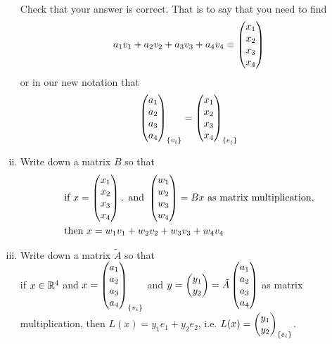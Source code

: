 \begin{question}
\begin{enumerate}[(i)]
\[\begin{aligned}
            \end{aligned}
        \]
        Check that your answer is correct. That is to say that you need to find 
        \[
            \begin{aligned}
                a_1v_1+a_2v_2+a_3v_3+a_4v_4=\begin{pmatrix} x_1\\ x_2\\x_3 \\ x_4\end{pmatrix}
            \end{aligned}
        \]
        or in our new notation that 
        \[
            \begin{aligned}
                \begin{pmatrix} a_1\\ a_2\\a_3 \\ a_4\end{pmatrix}_{\{v_i\}}=\begin{pmatrix} x_1\\ x_2\\x_3 \\ x_4\end{pmatrix}_{\{e_i\}}
            \end{aligned}
        \]
        \item Write down a matrix $B$ so that 
        \[
            \begin{aligned}
                &\text{if } x=\begin{pmatrix} x_1\\ x_2\\x_3 \\ x_4\end{pmatrix},\text{ and } \begin{pmatrix} w_1\\ w_2\\w_3 \\ w_4\end{pmatrix}=Bx\text{ as matrix multiplication,}\\
                &\text{then } x=w_1v_1+w_2v_2+w_3v_3+w_4v_4
            \end{aligned}
        \]
        \item Write down a matrix $\tilde{A}$ so that\\
        if $x\in\mathbb R^4$ and $x=\begin{pmatrix} a_1\\ a_2\\a_3 \\ a_4\end{pmatrix}_{\{v_i\}}$ and $y=\begin{pmatrix} y_1\\ y_2\end{pmatrix}=\tilde{A}\begin{pmatrix} a_1\\ a_2\\a_3 \\ a_4\end{pmatrix}$ as matrix multiplication, then $L(x)=y_1e_1+y_2e_2$, i.e. $L(x)=\begin{pmatrix} y_1\\ y_2\end{pmatrix}_{\{e_i\}}$.
    \end{enumerate}
\end{question}